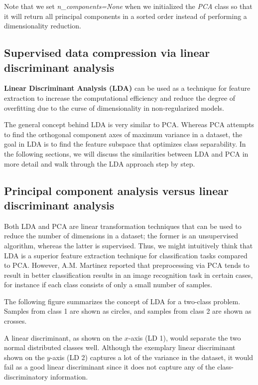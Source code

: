 \documentclass[11pt]{article}
\begin{document}
    Note that we set \emph{n\_components=None} when we initialized the
\emph{PCA} class so that it will return all principal components in a
sorted order instead of performing a dimensionality reduction.

    \subsection{Supervised data compression via linear discriminant
analysis}\label{supervised-data-compression-via-linear-discriminant-analysis}

    \textbf{Linear Discriminant Analysis (LDA)} can be used as a technique
for feature extraction to increase the computational efficiency and
reduce the degree of overfitting due to the curse of dimensionality in
non-regularized models.

The general concept behind LDA is very similar to PCA. Whereas PCA
attempts to find the orthogonal component axes of maximum variance in a
dataset, the goal in LDA is to find the feature subspace that optimizes
class separability. In the following sections, we will discuss the
similarities between LDA and PCA in more detail and walk through the LDA
approach step by step.

    \subsection{Principal component analysis versus linear discriminant
analysis}\label{principal-component-analysis-versus-linear-discriminant-analysis}

    Both LDA and PCA are linear transformation techniques that can be used
to reduce the number of dimensions in a dataset; the former is an
unsupervised algorithm, whereas the latter is supervised. Thus, we might
intuitively think that LDA is a superior feature extraction technique
for classification tasks compared to PCA. However, A.M. Martinez
reported that preprocessing via PCA tends to result in better
classification results in an image recognition task in certain cases,
for instance if each class consists of only a small number of samples.

The following figure summarizes the concept of LDA for a two-class
problem. Samples from class 1 are shown as circles, and samples from
class 2 are shown as crosses.

    A linear discriminant, as shown on the \(x\)-axis (LD 1), would separate
the two normal distributed classes well. Although the exemplary linear
discriminant shown on the \(y\)-axis (LD 2) captures a lot of the
variance in the dataset, it would fail as a good linear discriminant
since it does not capture any of the class-discriminatory information.
\end{document}

